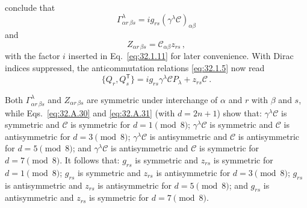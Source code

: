conclude that
\begin{equation}
  \Gamma^\lambda_{\alpha r\,\beta s}
  =ig_{rs}(\gamma^\lambda\mathcal C)_{\alpha\beta}
  \tag{32.1.11}\label{eq:32.1.11}
\end{equation}
and
\begin{equation}
  Z_{\alpha r\,\beta s}=\mathcal C_{\alpha\beta}z_{rs}\,,
  \tag{32.1.12}\label{eq:32.1.12}
\end{equation}
with the factor \(i\) inserted in Eq.~\eqref{eq:32.1.11} for later
convenience. With Dirac indices suppressed, the anticommutation relations
\eqref{eq:32.1.5} now read
\begin{equation}
  \{Q_r,Q_s^{\mathsf T}\}
  =ig_{rs}\gamma^\lambda\mathcal C P_\lambda+z_{rs}\mathcal C\,.
  \tag{32.1.13}\label{eq:32.1.13}
\end{equation}

Both \(\Gamma^\lambda_{\alpha r\,\beta s}\) and
\(Z_{\alpha r\,\beta s}\) are symmetric under interchange of \(\alpha\)
and \(r\) with \(\beta\) and \(s\), while Eqs.~\eqref{eq:32.A.30} and
\eqref{eq:32.A.31} (with \(d=2n+1\)) show that:
\(\gamma^\lambda\mathcal C\) is symmetric and \(\mathcal C\) is symmetric
for \(d=1\pmod 8\); \(\gamma^\lambda\mathcal C\) is symmetric and
\(\mathcal C\) is antisymmetric for \(d=3\pmod 8\);
\(\gamma^\lambda\mathcal C\) is antisymmetric and \(\mathcal C\) is
antisymmetric for \(d=5\pmod 8\); and
\(\gamma^\lambda\mathcal C\) is antisymmetric and \(\mathcal C\) is
symmetric for \(d=7\pmod 8\). It follows that: \(g_{rs}\) is symmetric and
\(z_{rs}\) is symmetric for \(d=1\pmod 8\); \(g_{rs}\) is symmetric and
\(z_{rs}\) is antisymmetric for \(d=3\pmod 8\); \(g_{rs}\) is
antisymmetric and \(z_{rs}\) is antisymmetric for \(d=5\pmod 8\); and
\(g_{rs}\) is antisymmetric and \(z_{rs}\) is symmetric for
\(d=7\pmod 8\).

